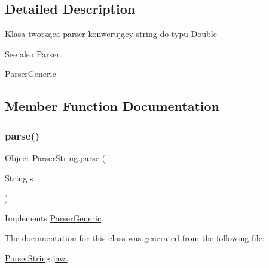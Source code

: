 \subsection{Detailed Description}
Klasa tworząca parser konwerujący string do typu Double \begin{DoxySeeAlso}{See also}
\hyperlink{classParser}{Parser} 

\hyperlink{interfaceParserGeneric}{Parser\+Generic} 
\end{DoxySeeAlso}


\subsection{Member Function Documentation}
\mbox{\label{classParserString_a7054c77bf5579a99a7abf166aad1c640}} 
\subsubsection{\texorpdfstring{parse()}{parse()}}
{\footnotesize\ttfamily Object Parser\+String.\+parse (\begin{DoxyParamCaption}\item[{String}]{s }\end{DoxyParamCaption})\hspace{0.3cm}{\ttfamily [inline]}}



Implements \hyperlink{interfaceParserGeneric_a42d671b89e41a5adb31a41c59db57503}{Parser\+Generic}.



The documentation for this class was generated from the following file\+:\begin{DoxyCompactItemize}
\item 
\hyperlink{ParserString_8java}{Parser\+String.\+java}\end{DoxyCompactItemize}
